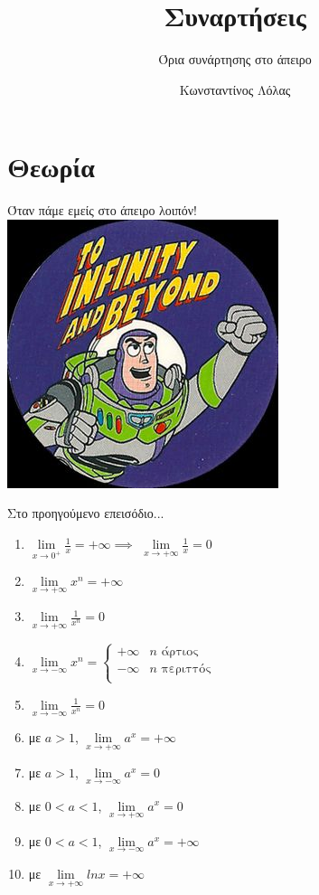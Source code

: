 \documentclass[greek]{beamer}
\title{Συναρτήσεις}
\subtitle{Όρια συνάρτησης στο άπειρο}
\author[Λόλας]{Κωνσταντίνος Λόλας}
\date{}
\begin{document}
\begin{frame}
 \titlepage
\end{frame}

\section{Θεωρία}
\begin{frame}{Όταν πάμε εμείς στο άπειρο λοιπόν!}
 \centering
 \includegraphics[height=0.6\columnwidth]{images/buzz}
\end{frame}

\begin{frame}{Στο προηγούμενο επεισόδιο...}
 \begin{enumerate}
  \item $\lim\limits_{x \to 0^+}{ \frac{1}{x} } = +\infty\implies$ \pause $\lim\limits_{x \to +\infty}{ \frac{1}{x} }=0$ \pause
  \item $\lim\limits_{x \to +\infty}{ x^n } = +\infty$ \pause
  \item $\lim\limits_{x \to +\infty}{ \frac{1}{x^n} } = 0$ \pause
  \item $\lim\limits_{x \to -\infty}{ x^n } = \begin{cases}
          +\infty & n \text{ άρτιος}   \\
          -\infty & n \text{ περιττός} \\
         \end{cases}$ \pause
  \item $\lim\limits_{x \to -\infty}{ \frac{1}{x^n} } = 0$ \pause
  \item με $a>1$, $\lim\limits_{x \to +\infty}{ a^x } = +\infty$ \pause
  \item με $a>1$, $\lim\limits_{x \to -\infty}{ a^x } = 0$ \pause
  \item με $0<a<1$, $\lim\limits_{x \to +\infty}{ a^x } = 0$ \pause
  \item με $0<a<1$, $\lim\limits_{x \to -\infty}{ a^x } = +\infty$ \pause
  \item με $\lim\limits_{x \to +\infty}{ lnx } = +\infty$
 \end{enumerate}
\end{frame}
\end{document}
